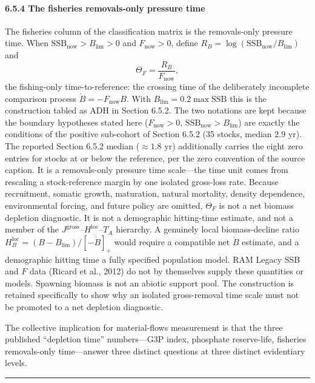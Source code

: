 \documentclass[11pt]{article}
\begin{document}
\paragraph{6.5.4 The fisheries removals-only pressure
time}\label{the-fisheries-removals-only-pressure-time}

The fisheries column of the classification matrix is the removals-only pressure time. When \(\mathrm{SSB}_{\mathrm{now}} > B_{\lim} > 0\) and \(F_{\mathrm{now}} > 0\), define \(R_B = \log(\mathrm{SSB}_{\mathrm{now}}/B_{\lim})\) and \[\Theta_F = \frac{R_B}{F_{\mathrm{now}}},\] the fishing-only time-to-reference: the crossing time of the deliberately incomplete comparison process \(\dot B = -F_{\mathrm{now}}B\). With \(B_{\lim} = 0.2 \max \mathrm{SSB}\) this is the construction tabled as ADH in Section 6.5.2. The two notations are kept because the boundary hypotheses stated here (\(F_{\mathrm{now}} > 0\), \(\mathrm{SSB}_{\mathrm{now}} > B_{\lim}\)) are exactly the conditions of the positive sub-cohort of Section 6.5.2 (35 stocks, median \(2.9\) yr). The reported Section 6.5.2 median (\(\approx 1.8\) yr) additionally carries the eight zero entries for stocks at or below the reference, per the zero convention of the source caption. It is a removals-only pressure time scale---the time unit comes from rescaling a stock-reference margin by one isolated gross-loss rate. Because recruitment, somatic growth, maturation, natural mortality, density dependence, environmental forcing, and future policy are omitted, \(\Theta_F\) is not a net biomass depletion diagnostic. It is not a demographic hitting-time estimate, and not a member of the \(J^{\mathrm{gross}}\)--\(H^{\mathrm{loc}}\)--\(T_A\) hierarchy. A genuinely local biomass-decline ratio \(H_B^{\mathrm{loc}} = (B - B_{\lim})/[-\dot B]_+\) would require a compatible net \(\dot B\) estimate, and a demographic hitting time a fully specified population model. RAM Legacy SSB and \(F\) data (Ricard et al., 2012) do not by themselves supply these quantities or models. Spawning biomass is not an abiotic support pool. The construction is retained specifically to show why an isolated gross-removal time scale must not be promoted to a net depletion diagnostic.

The collective implication for material-flows measurement is that the
three published ``depletion time'' numbers---G3P index, phosphate
reserve-life, fisheries removals-only time---answer three distinct
questions at three distinct evidentiary levels.

\begin{center}\rule{0.5\linewidth}{0.5pt}\end{center}
\end{document}
